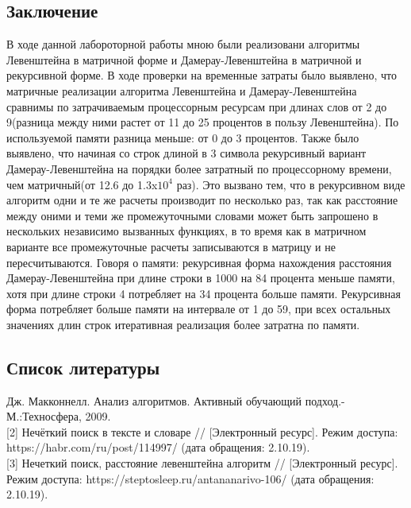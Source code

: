\documentclass[a4paper, 14pt]{article}
\begin{document}
    \begin{center}
    	\newpage
        \section*{Заключение}
        \begin{flushleft}
        В ходе данной лабороторной работы мною были реализовани алгоритмы Левенштейна в матричной форме и Дамерау-Левенштейна в матричной и рекурсивной форме. В ходе проверки на временные затраты было выявлено, что матричные реализации алгоритма Левенштейна и Дамерау-Левенштейна сравнимы по затрачиваемым процессорным ресурсам при длинах слов от 2 до 9(разница между ними растет от 11 до 25 процентов в пользу Левенштейна). По используемой памяти разница меньше: от 0 до 3 процентов. Также было выявлено, что начиная со строк длиной в 3 символа рекурсивный вариант Дамерау-Левенштейна на порядки более затратный по процессорному времени, чем матричный(от 12.6 до 1.3x$10^4$ раз). Это вызвано тем, что в рекурсивном виде алгоритм одни и те же расчеты производит по несколько раз, так как расстояние между оними и теми же промежуточными словами может быть запрошено в нескольких независимо вызванных функциях, в то время как в матричном варианте все промежуточные расчеты записываются в матрицу и не пересчитываются. Говоря о памяти: рекурсивная форма нахождения расстояния Дамерау-Левенштейна при длине строки в 1000 на 84 процента меньше памяти, хотя при длине строки 4 потребляет на 34 процента больше памяти. Рекурсивная форма потребляет больше памяти на интервале от 1 до 59, при всех остальных значениях длин строк итеративная реализация более затратна по памяти.
        \end{flushleft}
    \end{center}

    \begin{center}
    	\newpage
        \section*{Список литературы}
        \begin{flushleft}
        [1] Дж. Макконнелл. Анализ алгоритмов. Активный обучающий подход.-М.:Техносфера, 2009.\\
        
[2] Нечёткий поиск в тексте и словаре // [Электронный ресурс]. Режим доступа: https://habr.com/ru/post/114997/ (дата обращения: 2.10.19).\\

[3] Нечеткий поиск, расстояние левенштейна алгоритм // [Электронный ресурс]. Режим доступа: https://steptosleep.ru/antananarivo-106/ (дата обращения: 2.10.19).
        \end{flushleft}
    \end{center}        
\end{document}
